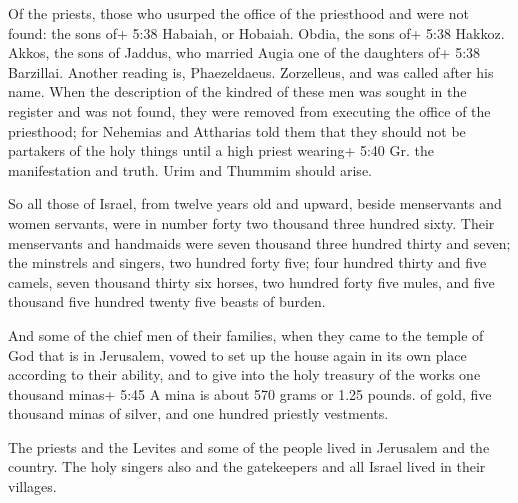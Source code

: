  Of the priests, those who usurped the office of the
priesthood and were not found: the sons of+ 5:38 Habaiah, or Hobaiah.
Obdia, the sons of+ 5:38 Hakkoz. Akkos, the sons of Jaddus, who married
Augia one of the daughters of+ 5:38 Barzillai. Another reading is,
Phaezeldaeus. Zorzelleus, and was called after his name. 
When the description of the kindred of these men was sought in the
register and was not found, they were removed from executing the office
of the priesthood;  for Nehemias and Attharias told them
that they should not be partakers of the holy things until a high priest
wearing+ 5:40 Gr. the manifestation and truth. Urim and Thummim should
arise.

 So all those of Israel, from twelve years old and upward,
beside menservants and women servants, were in number forty two thousand
three hundred sixty.  Their menservants and handmaids were
seven thousand three hundred thirty and seven; the minstrels and
singers, two hundred forty five;  four hundred thirty and
five camels, seven thousand thirty six horses, two hundred forty five
mules, and five thousand five hundred twenty five beasts of burden.

 And some of the chief men of their families, when they
came to the temple of God that is in Jerusalem, vowed to set up the
house again in its own place according to their ability, 
and to give into the holy treasury of the works one thousand minas+ 5:45
A mina is about 570 grams or 1.25 pounds. of gold, five thousand minas
of silver, and one hundred priestly vestments.

 The priests and the Levites and some of the people lived
in Jerusalem and the country. The holy singers also and the gatekeepers
and all Israel lived in their villages.

